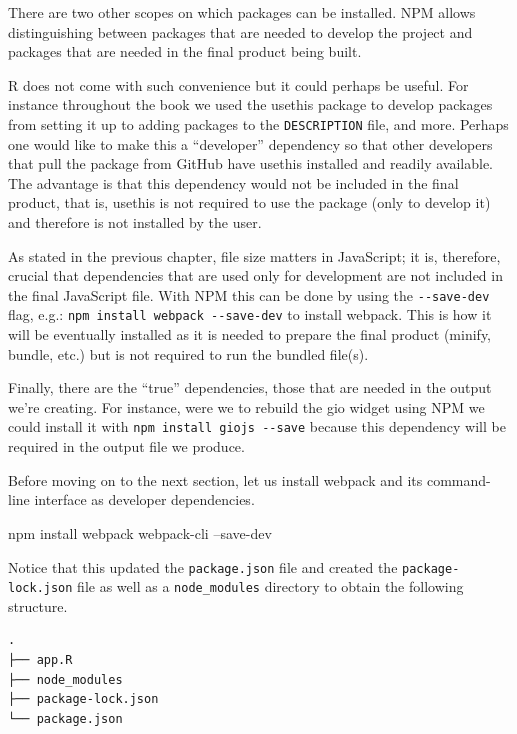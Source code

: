 \documentclass[10pt,]{krantz}
\makeatletter
\newenvironment{Shaded}{\begin{snugshade}}{\end{snugshade}}
\newcommand{\ExtensionTok}[1]{#1}
\newcommand{\NormalTok}[1]{#1}
\newenvironment{kframe}{%
\medskip{}
\setlength{\fboxsep}{.8em}
 \def\at@end@of@kframe{}%
 \ifinner\ifhmode%
  \def\at@end@of@kframe{\end{minipage}}%
  \begin{minipage}{\columnwidth}%
 \fi\fi%
 \def\FrameCommand##1{\hskip\@totalleftmargin \hskip-\fboxsep
 \colorbox{shadecolor}{##1}\hskip-\fboxsep
     \hskip-\linewidth \hskip-\@totalleftmargin \hskip\columnwidth}%
 \MakeFramed {\advance\hsize-\width
   \@totalleftmargin\z@ \linewidth\hsize
   \@setminipage}}%
 {\par\unskip\endMakeFramed%
 \at@end@of@kframe}
\renewenvironment{Shaded}{\begin{kframe}}{\end{kframe}}
\makeatother
\begin{document}
There are two other scopes on which packages can be installed. NPM allows distinguishing between packages that are needed to develop the project and packages that are needed in the final product being built.

R does not come with such convenience but it could perhaps be useful. For instance throughout the book we used the usethis package to develop packages from setting it up to adding packages to the \texttt{DESCRIPTION} file, and more. Perhaps one would like to make this a ``developer'' dependency so that other developers that pull the package from GitHub have usethis installed and readily available. The advantage is that this dependency would not be included in the final product, that is, usethis is not required to use the package (only to develop it) and therefore is not installed by the user.

As stated in the previous chapter, file size matters in JavaScript; it is, therefore, crucial that dependencies that are used only for development are not included in the final JavaScript file. With NPM this can be done by using the \texttt{-\/-save-dev} flag, e.g.: \texttt{npm\ install\ webpack\ -\/-save-dev} to install webpack. This is how it will be eventually installed as it is needed to prepare the final product (minify, bundle, etc.) but is not required to run the bundled file(s).

Finally, there are the ``true'' dependencies, those that are needed in the output we're creating. For instance, were we to rebuild the gio widget using NPM we could install it with \texttt{npm\ install\ giojs\ -\/-save} because this dependency will be required in the output file we produce.

Before moving on to the next section, let us install webpack and its command-line interface as developer dependencies.

\begin{Shaded}
\begin{Highlighting}[]
\ExtensionTok{npm}\NormalTok{ install webpack webpack-cli --save-dev}
\end{Highlighting}
\end{Shaded}

Notice that this updated the \texttt{package.json} file and created the \texttt{package-lock.json} file as well as a \texttt{node\_modules} directory to obtain the following structure.

\begin{verbatim}
.
├── app.R
├── node_modules
├── package-lock.json
└── package.json
\end{verbatim}
\end{document}
